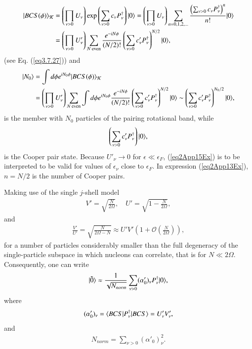 \begin{subappendices}
\begin{align}
\nonumber|{BCS(\phi)} \rangle_{\mathcal K}&=\left(\prod_{\nu>0}U_\nu\right)\exp\left(\sum_{\nu>0}c_\nu P_\nu^\dagger\right)|{0} \rangle=\left(\prod_{\nu>0}U_\nu\right)\sum_{n=0,1,2,\dots}\frac{\left(\sum_{\nu>0}c_\nu P^\dagger_\nu\right)^n}{n!}|{0} \rangle\\
&=\left(\prod_{\nu>0}U'_\nu\right)\sum_{N \text{ even}}\frac{e^{-iN\phi}}{(N/2)!}\left(\sum_{\nu>0}c'_\nu P_\nu^\dagger\right)^{N/2}|{0} \rangle,
\end{align}
(see Eq. (\ref{eq3.7.27})) and
\begin{align}\label{eq2App14Ex}
\nonumber|{N_0} \rangle&=\int d\phi e^{iN_0\phi}|{BCS(\phi)} \rangle_{\mathcal K}\\
&=\left(\prod_{\nu>0}U'_\nu\right)\sum_{N \text{ even}}\int d\phi e^{iN_0\phi}\frac{e^{-iN\phi}}{(N/2)!}\left(\sum_{\nu>0}c'_\nu P_\nu^\dagger\right)^{N/2}|{0} \rangle\sim\left(\sum_{\nu>0}c'_\nu P_\nu^\dagger\right)^{N_0/2}|{0} \rangle,
\end{align}
is the member with $N_0$ particles of the pairing rotational band, while
\begin{align}\label{eq2App15Ex}
\left(\sum_{\nu>0}c'_\nu P_\nu^\dagger\right)\ket{0}, \idx{Cooper pair!--state}
\end{align}
is the Cooper pair state. Because $U'_\nu\to 0$ for $\epsilon\ll \epsilon_F$, (\ref{eq2App15Ex}) is to be interpreted to be valid for values of $\epsilon_\nu$ close to $\epsilon_F$. In expression (\ref{eq2App13Ex}), $n=N/2$ is the number of Cooper pairs.


Making use of the single $j$-shell model
\begin{align}\label{eq2App16Ex}
V'=\sqrt{\frac{N}{2\Omega}},\quad U'=\sqrt{1-\frac{N}{2\Omega}},
\end{align}
and
\begin{align}\label{eq2App17Ex}
\frac{V'}{U'}=\sqrt{\frac{N}{2\Omega-N}}\approx U'V'\left(1+\mathcal O\left(\frac{N}{2\Omega}\right)\right),
\end{align}
for a number of particles considerably smaller than the full degeneracy of the single-particle subspace in which nucleons can correlate, that is for $N\ll2\Omega$. Consequently, one can write
\begin{align}\label{eq2App18Ex}
|{\tilde 0} \rangle\approx\frac{1}{\sqrt{ N_{norm}}}\sum_{\nu>0}(\alpha'_0)_\nu P^\dagger_\nu|{0} \rangle,
\end{align}
where
\begin{align}\label{eq2App19Ex}
(\alpha'_0)_\nu =\langle {BCS|P^\dagger_\nu|BCS} \rangle=U'_\nu V'_\nu,
\end{align}
and
\begin{align}\label{eq2App20Ex}
N_{norm}=\sum_{\nu>0}(\alpha'_0)_\nu^2.
\end{align}











\end{subappendices}
